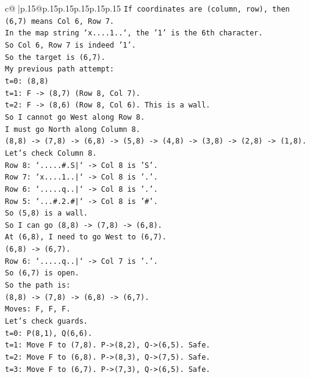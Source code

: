 \documentclass{article}
\begin{document}
{\begin{supertabular}{c@{$\;$}|p{.15\linewidth}@{}p{.15\linewidth}p{.15\linewidth}p{.15\linewidth}p{.15\linewidth}p{.15\linewidth}}
{{{\texttt{If coordinates are (column, row), then (6,7) means Col 6, Row 7.} \\
\texttt{In the map string `x....1..`, the '1' is the 6th character.} \\
\texttt{So Col 6, Row 7 is indeed '1'.} \\
\texttt{So the target is (6,7).} \\
\texttt{My previous path attempt:} \\
\texttt{t=0: (8,8)} \\
\texttt{t=1: F {-}> (8,7) (Row 8, Col 7).} \\
\texttt{t=2: F {-}> (8,6) (Row 8, Col 6). This is a wall.} \\
\texttt{So I cannot go West along Row 8.} \\
\texttt{I must go North along Column 8.} \\
\texttt{(8,8) {-}> (7,8) {-}> (6,8) {-}> (5,8) {-}> (4,8) {-}> (3,8) {-}> (2,8) {-}> (1,8).} \\
\texttt{Let's check Column 8.} \\
\texttt{Row 8: `.....\#.S|` {-}> Col 8 is 'S'.} \\
\texttt{Row 7: `x....1..|` {-}> Col 8 is '.'.} \\
\texttt{Row 6: `.....q..|` {-}> Col 8 is '.'.} \\
\texttt{Row 5: `...\#.2.\#|` {-}> Col 8 is '\#'.} \\
\texttt{So (5,8) is a wall.} \\
\texttt{So I can go (8,8) {-}> (7,8) {-}> (6,8).} \\
\texttt{At (6,8), I need to go West to (6,7).} \\
\texttt{(6,8) {-}> (6,7).} \\
\texttt{Row 6: `.....q..|` {-}> Col 7 is '.'.} \\
\texttt{So (6,7) is open.} \\
\texttt{So the path is:} \\
\texttt{(8,8) {-}> (7,8) {-}> (6,8) {-}> (6,7).} \\
\texttt{Moves: F, F, F.} \\
\texttt{Let's check guards.} \\
\texttt{t=0: P(8,1), Q(6,6).} \\
\texttt{t=1: Move F to (7,8). P{-}>(8,2), Q{-}>(6,5). Safe.} \\
\texttt{t=2: Move F to (6,8). P{-}>(8,3), Q{-}>(7,5). Safe.} \\
\texttt{t=3: Move F to (6,7). P{-}>(7,3), Q{-}>(6,5). Safe.} \\
}}}
\end{supertabular}}
\end{document}
